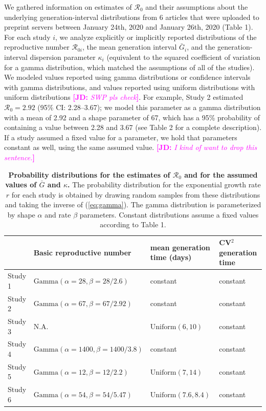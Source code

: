 \documentclass[12pt]{article}
\newcommand{\eref}[1]{(\ref{eq:#1})}
\newcommand{\comment}[3]{\textcolor{#1}{\textbf{[#2: }\textsl{#3}\textbf{]}}}
\newcommand{\jd}[1]{\comment{magenta}{JD}{#1}}
\begin{document}
We gathered information on estimates of $\mathcal R_0$ and their assumptions about the underlying generation-interval distributions from 6 articles that were uploaded to preprint servers between January 24th, 2020 and January 26th, 2020 (Table 1).
For each study $i$, we analyze explicitly or implicitly reported distributions of the reproductive number $\mathcal R_{0i}$, the mean generation interval $\bar G_i$, and the generation-interval dispersion parameter $\kappa_i$ (equivalent to the squared coefficient of variation for a gamma distribution, which matched the assumptions of all of the studies).
We modeled values reported using gamma distributions or confidence intervals with gamma distributions, and values reported using uniform distributions with uniform distributions \jd{SWP pls check}.
For example, Study 2 estimated $\mathcal R_0 = 2.92$ (95\% CI: 2.28--3.67);
we model this parameter as a gamma distribution with a mean of 2.92 and a shape parameter of 67, which has a 95\% probability of containing a value between 2.28 and 3.67 (see Table 2 for a complete description).
If a study assumed a fixed value for a parameter, we hold that parameters constant as well, using the same assumed value. \jd{I kind of want to drop this sentence.}

\begin{table}[t]
\begin{center}
\footnotesize
\begin{tabular}{l|l|l|l}
 & Basic reproductive number & mean generation time (days) & CV$^2$ generation time \\
\hline
Study 1 & $\mathrm{Gamma}(\alpha=28, \beta=28/2.6)$ & constant & constant \\
\hline
Study 2 & $\mathrm{Gamma}(\alpha=67, \beta=67/2.92)$ & constant & constant \\
\hline
Study 3 & N.A. & $\mathrm{Uniform}(6, 10)$ & constant\\
\hline
Study 4 & $\mathrm{Gamma}(\alpha=1400, \beta=1400/3.8)$ & constant & constant \\
\hline
Study 5 & $\mathrm{Gamma}(\alpha=12, \beta=12/2.2)$ & $\mathrm{Uniform}(7, 14)$ & constant\\
\hline
Study 6 & $\mathrm{Gamma}(\alpha=54, \beta=54/5.47)$ & $\mathrm{Uniform}(7.6, 8.4)$ & constant
\end{tabular}
\end{center}
\caption{
\textbf{Probability distributions for the estimates of $\mathcal R_0$ and for the assumed values of $\bar G$ and $\kappa$.}
The probability distribution for the exponential growth rate $r$ for each study is obtained by drawing random samples from these distributions and taking the inverse of \eref{gamma}.
The gamma distribution is parameterized by shape $\alpha$ and rate $\beta$ parameters.
Constant distributions assume a fixed values according to Table 1.
}
\end{table}
\end{document}
